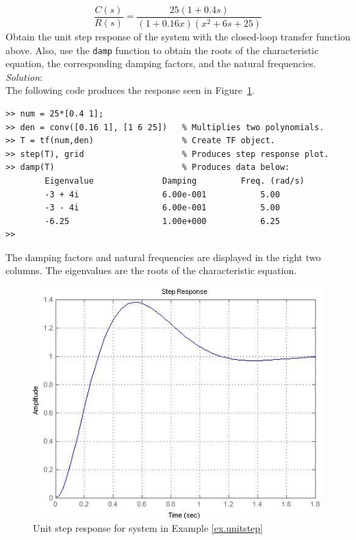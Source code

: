 \vspace{6pt}
\begin{workex}  \label{ex.unitstep}
\begin{equation*}
    \frac{C(s)}{R(s)} =
        \frac{25(1+0.4s)}{ (1+0.16x)(x^2+6s+25)}
\end{equation*}
Obtain the unit step response of the system with the closed-loop transfer function above.  Also, use the \verb=damp= function to obtain the roots of the characteristic equation, the corresponding damping factors, and the natural frequencies.\\
\textit{Solution}:\\
The following code produces the response seen in Figure~\ref{fig.ex.unitstep}.
\begin{verbatim}
>> num = 25*[0.4 1];
>> den = conv([0.16 1], [1 6 25])   % Multiplies two polynomials.
>> T = tf(num,den)                  % Create TF object.
>> step(T), grid                    % Produces step response plot.
>> damp(T)                          % Produces data below:
        Eigenvalue              Damping         Freq. (rad/s)
        -3 + 4i                 6.00e-001           5.00
        -3 - 4i                 6.00e-001           5.00
        -6.25                   1.00e+000           6.25
>>
\end{verbatim}
The damping factors and natural frequencies are displayed in the right two columns.  The eigenvalues are the roots of the characteristic equation.
\end{workex}

\begin{figure}[thb]
\centering
\includegraphics[width=.75\textwidth]{unitstep}
\caption{ \footnotesize
        Unit step response for system in Example \ref{ex.unitstep}
        \label{fig.ex.unitstep}
        }
\end{figure}

